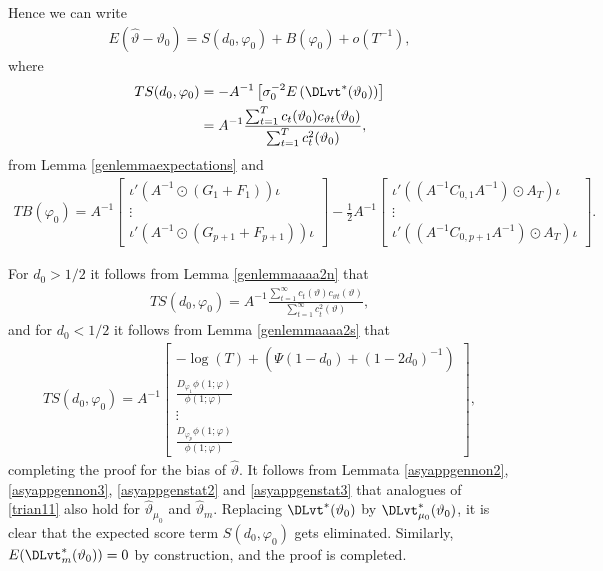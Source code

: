 {{Hence we can write 
\begin{align}
    E\left( \hat{\vartheta} - \vartheta_0 \right) = S(d_0,\varphi_0) + B(\varphi_0) + o(T^{-1}), \label{trian11}
\end{align}
where 
\begin{align*}
    T S(d_0,\varphi_0) &= - A^{-1} \left[ \sigma^{-2}_0 E \left( \DLvt^*(\vartheta_0) \right)  \right] \\
    &= A^{-1}  \frac{\sum_{t = 1}^T c_{t}(\vartheta_0) c_{\vartheta t}(\vartheta_0)}{\sum_{t = 1}^T c^2_{t}(\vartheta_0)},
\end{align*}
from Lemma \ref{genlemmaexpectations} and 
\begin{align}
    T B(\varphi_0) = A^{-1}   \begin{bmatrix}
\iota' \left( A^{-1} \odot \left( G_{1} + F_{1} \right)\right)\iota \\
\vdots    \\
\iota' \left( A^{-1} \odot\left( G_{p+1} + F_{p+1} \right) \right)\iota 
\end{bmatrix}  - \frac{1}{2} A^{-1} \begin{bmatrix}
\iota' \left(\left(A^{-1} C_{0,1} A^{-1} \right) \odot A_T \right) \iota \\
\vdots  \\
\iota' \left(\left(A^{-1} C_{0,p+1} A^{-1} \right) \odot A_T \right) \iota
\end{bmatrix}. \label{BtINT}
\end{align}

For $d_0 > 1/2$ it follows from Lemma \ref{genlemmaaaa2n} that
\begin{align*}
    TS(d_0,\varphi_0) =  A^{-1} \frac{\sum_{t = 1}^{\infty} c_{t}(\vartheta) c_{\vartheta t}(\vartheta)}{ \sum_{t = 1}^{\infty} c^2_{t}(\vartheta) },
\end{align*}
and for $d_0 < 1/2$ it follows from Lemma \ref{genlemmaaaa2s} that
\begin{align*}
    TS(d_0,\varphi_0) = A^{-1}  \begin{bmatrix}
  -\log(T)+\left(\Psi(1-d_0) + (1-2d_0)^{-1}\right) \\
\frac{D_{\varphi_1 } \phi(1;\varphi)}{ \phi(1;\varphi) } \\
\vdots    \\
\frac{D_{\varphi_p } \phi(1;\varphi)}{ \phi(1;\varphi) }
\end{bmatrix},
\end{align*}
completing the proof for the bias of $\hat{\vartheta}$. It follows from Lemmata \ref{asyappgennon2}, \ref{asyappgennon3}, \ref{asyappgenstat2} and \ref{asyappgenstat3} that analogues of \eqref{trian11} also hold for $\hat{\vartheta}_{\mu_0}$ and $\hat{\vartheta}_m$. Replacing $\DLvt^*(\vartheta_0)$ by $\DLvt_{\mu_0}^*(\vartheta_0)$, it is clear that the expected score term $S(d_0,\varphi_0)$ gets eliminated. Similarly,  $E (\DLvt_{m}^*(\vartheta_0)) = 0$ by construction, and the proof is completed.  

}}
